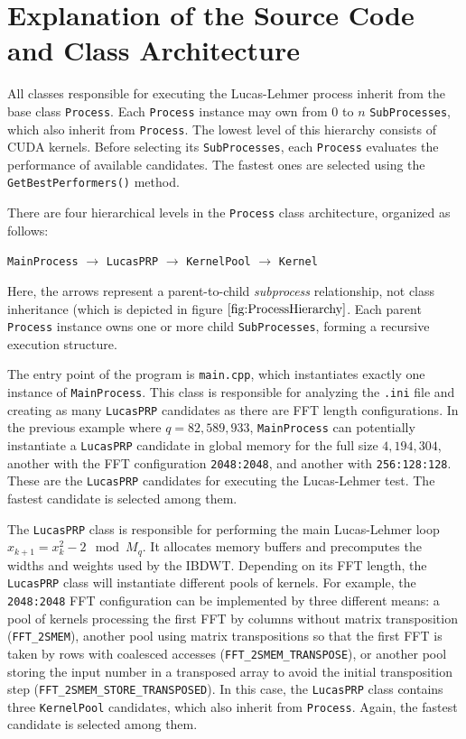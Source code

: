 \documentclass{article}
\begin{document}
\section{Explanation of the Source Code and Class Architecture}

All classes responsible for executing the Lucas-Lehmer process inherit from the base class \texttt{Process}. Each \texttt{Process} instance may own from 0 to $n$ \texttt{SubProcesses}, which also inherit from \texttt{Process}. The lowest level of this hierarchy consists of CUDA kernels. Before selecting its \texttt{SubProcesses}, each \texttt{Process} evaluates the performance of available candidates. The fastest ones are selected using the \texttt{GetBestPerformers()} method.

There are four hierarchical levels in the \texttt{Process} class architecture, organized as follows:
\begin{center}
\texttt{MainProcess} $\longrightarrow$ \texttt{LucasPRP} $\longrightarrow$ \texttt{KernelPool} $\longrightarrow$ \texttt{Kernel}
\end{center}
Here, the arrows represent a parent-to-child \emph{subprocess} relationship, not class inheritance (which is depicted in figure $\ref{fig:ProcessHierarchy}$. Each parent \texttt{Process} instance owns one or more child \texttt{SubProcesses}, forming a recursive execution structure.

The entry point of the program is \texttt{main.cpp}, which instantiates exactly one instance of \texttt{MainProcess}. This class is responsible for analyzing the \texttt{.ini} file and creating as many \texttt{LucasPRP} candidates as there are FFT length configurations. In the previous example where $q = 82,\!589,\!933$, \texttt{MainProcess} can potentially instantiate a \texttt{LucasPRP} candidate in global memory for the full size $4,\!194,\!304$, another with the FFT configuration \texttt{2048:2048}, and another with \texttt{256:128:128}. These are the \texttt{LucasPRP} candidates for executing the Lucas-Lehmer test. The fastest candidate is selected among them.

The \texttt{LucasPRP} class is responsible for performing the main Lucas-Lehmer loop $x_{k+1} = x_k^2 - 2 \mod M_q$. It allocates memory buffers and precomputes the widths and weights used by the IBDWT. Depending on its FFT length, the \texttt{LucasPRP} class will instantiate different pools of kernels. For example, the \texttt{2048:2048} FFT configuration can be implemented by three different means: a pool of kernels processing the first FFT by columns without matrix transposition (\texttt{FFT\_2SMEM}), another pool using matrix transpositions so that the first FFT is taken by rows with coalesced accesses (\texttt{FFT\_2SMEM\_TRANSPOSE}), or another pool storing the input number in a transposed array to avoid the initial transposition step (\texttt{FFT\_2SMEM\_STORE\_TRANSPOSED}). In this case, the \texttt{LucasPRP} class contains three \texttt{KernelPool} candidates, which also inherit from \texttt{Process}. Again, the fastest candidate is selected among them.
\end{document}
